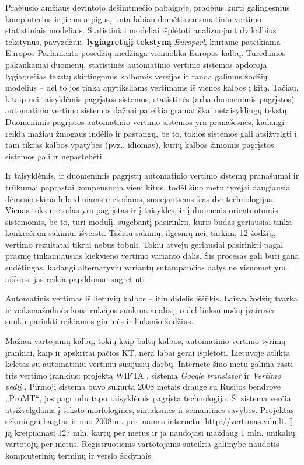 \begin{multicols}{2}
 Praėjusio amžiaus devintojo dešimtmečio pabaigoje, pradėjus kurti galingesnius kompiuterius ir jiems atpigus, imta labiau domėtis automatinio vertimo statistiniais modeliais. Statistiniai modeliai išplėtoti analizuojant dvikalbius tekstynus, pavyzdžiui, \textbf{lygiagretųjį tekstyną} \textit{Europarl}, kuriame pateikiama Europos Parlamento posėdžių medžiaga vienuolika Europos kalbų. Turėdamos pakankamai duomenų, statistinės automatinio vertimo sistemos apdoroja lygiagrečias tekstų skirtingomis kalbomis versijas ir randa galimus žodžių modelius – dėl to jos tinka apytiksliams vertimams iš vienos kalbos į kitą. Tačiau, kitaip nei taisyklėmis pagrįstos sistemos, statistinės (arba duomenimis pagrįstos) automatinio vertimo sistemos dažnai pateikia gramatiškai netaisyklingų tekstų. Duomenimis pagrįstos automatinio vertimo sistemos yra pranašesnės, kadangi reikia mažiau žmogaus indėlio ir pastangų, be to, tokios sistemos gali atsižvelgti į tam tikras kalbos ypatybes (pvz., idiomas), kurių kalbos žiniomis pagrįstos sistemos gali ir nepastebėti.    


Ir taisyklėmis, ir duomenimis pagrįstų automatinio vertimo sistemų pranašumai ir trūkumai paprastai kompensuoja vieni kitus, todėl šiuo metu tyrėjai daugiausia dėmesio skiria hibridiniams metodams, susiejantiems šias dvi technologijas. Vienas toks metodas yra pagrįstas ir į taisykles, ir į duomenis orientuotomis sistemomis, be to, turi modulį, sugebantį pasirinkti, kuris būdas geriausiai tinka konkrečiam sakiniui išversti. Tačiau sakinių, ilgesnių nei, tarkim, 12 žodžių, vertimo rezultatai tikrai nebus tobuli. Tokiu atveju geriausiai pasirinkti pagal prasmę tinkamiausias kiekvieno vertimo varianto dalis. Šis procesas gali būti gana sudėtingas, kadangi alternatyvių variantų sutampančios dalys ne visuomet yra aiškios, jas reikia papildomai sugretinti. 

Automatinis vertimas iš lietuvių kalbos – itin didelis iššūkis. Laisva žodžių tvarka ir veiksmažodinės konstrukcijos sunkina analizę, o dėl linksniuočių įvairovės sunku parinkti reikiamos giminės ir linksnio žodžius.   

    Mažiau vartojamų kalbų, tokių kaip baltų kalbos, automatinio vertimo tyrimų įrankiai, kaip ir apskritai pačios KT, nėra labai gerai išplėtoti. Lietuvoje atlikta keletas su automatiniu vertimu susijusių darbų. Internete šiuo metu galima rasti tris vertimo įrankius: projektą WIFTA \cite{vertvdu},  sistemą \textit{Google translator} ir \textit{Vertimo vedlį} \cite{mvlab}. Pirmoji sistema buvo sukurta 2008 metais drauge su Rusijos bendrove „ProMT“, jos pagrindu tapo taisyklėmis pagrįsta technologija. Ši sistema verčia atsižvelgdama į teksto morfologines, sintaksines ir semantines savybes. Projektas sėkmingai baigtas ir nuo 2008 m. prieinamas internetu: http://vertimas.vdu.lt. Į ją kreipiamasi 127 mln. kartų per metus ir ja naudojasi maždaug 1 mln. unikalių vartotojų per metus. Registruotiems vartotojams suteikta galimybė naudotis kompiuterinių terminų ir verslo žodynais.


\end{multicols}
